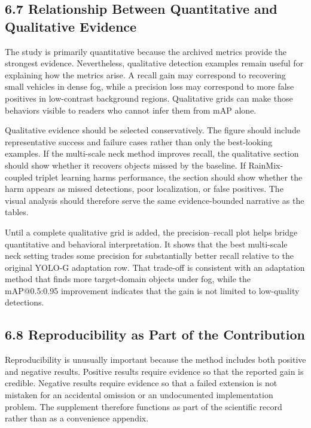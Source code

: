 \documentclass[
  11pt,
]{article}
\begin{document}
\hypertarget{relationship-between-quantitative-and-qualitative-evidence}{%
\subsection{6.7 Relationship Between Quantitative and Qualitative
Evidence}\label{relationship-between-quantitative-and-qualitative-evidence}}

The study is primarily quantitative because the archived metrics provide
the strongest evidence. Nevertheless, qualitative detection examples
remain useful for explaining how the metrics arise. A recall gain may
correspond to recovering small vehicles in dense fog, while a precision
loss may correspond to more false positives in low-contrast background
regions. Qualitative grids can make those behaviors visible to readers
who cannot infer them from mAP alone.

Qualitative evidence should be selected conservatively. The figure
should include representative success and failure cases rather than only
the best-looking examples. If the multi-scale neck method improves
recall, the qualitative section should show whether it recovers objects
missed by the baseline. If RainMix-coupled triplet learning harms
performance, the section should show whether the harm appears as missed
detections, poor localization, or false positives. The visual analysis
should therefore serve the same evidence-bounded narrative as the
tables.

Until a complete qualitative grid is added, the precision--recall plot
helps bridge quantitative and behavioral interpretation. It shows that
the best multi-scale neck setting trades some precision for
substantially better recall relative to the original YOLO-G adaptation
row. That trade-off is consistent with an adaptation method that finds
more target-domain objects under fog, while the mAP@0.5:0.95 improvement
indicates that the gain is not limited to low-quality detections.

\hypertarget{reproducibility-as-part-of-the-contribution}{%
\subsection{6.8 Reproducibility as Part of the
Contribution}\label{reproducibility-as-part-of-the-contribution}}

Reproducibility is unusually important because the method includes both
positive and negative results. Positive results require evidence so that
the reported gain is credible. Negative results require evidence so that
a failed extension is not mistaken for an accidental omission or an
undocumented implementation problem. The supplement therefore functions
as part of the scientific record rather than as a convenience appendix.
\end{document}
